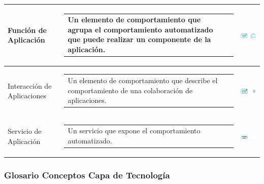 \begin{longtable}[c]{|p{2.5cm}|l|c|}
	Función de Aplicación		& \begin{tabular}[c]{p{7cm}@{}l@{}}Un elemento de comportamiento que agrupa el comportamiento automatizado que puede realizar un componente de la aplicación.\end{tabular} & \includegraphics[width=35mm]{arquitectura/adm_lenguaje/imgs/application/ApplicationFunction}          \\ \hline
	Interacción de Aplicaciones	& \begin{tabular}[c]{p{7cm}@{}l@{}}Un elemento de comportamiento que describe el comportamiento de una colaboración de aplicaciones.\end{tabular} & \includegraphics[width=35mm]{arquitectura/adm_lenguaje/imgs/application/ApplicationInteraction}          \\ \hline
	Servicio de Aplicación	   	& \begin{tabular}[c]{p{7cm}@{}l@{}}Un servicio que expone el comportamiento automatizado.\end{tabular} & \includegraphics[width=35mm]{arquitectura/adm_lenguaje/imgs/application/ApplicationService}          \\ \hline
\end{longtable}

\newpage

\subsubsection{Glosario Conceptos Capa de Tecnología}


